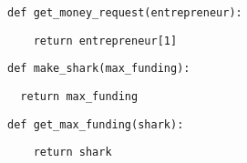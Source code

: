 \begin{lstlisting}
def get_money_request(entrepreneur):
\end{lstlisting}
\begin{solution}[0.5in]
\begin{lstlisting}
    return entrepreneur[1]
\end{lstlisting}
\end{solution}

\begin{lstlisting}
def make_shark(max_funding):
\end{lstlisting}
\begin{solution}[0.5in]
\begin{lstlisting}
  return max_funding
\end{lstlisting}
\end{solution}

\begin{lstlisting}
def get_max_funding(shark):
\end{lstlisting}
\begin{solution}[0.1in]
\begin{lstlisting}
    return shark
\end{lstlisting}
\end{solution}
